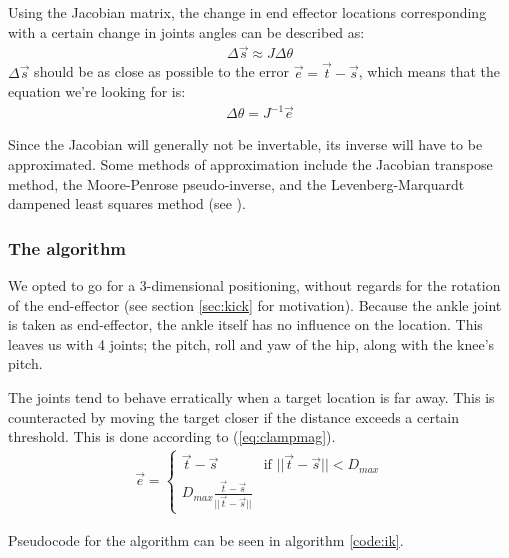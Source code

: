 \documentclass[a4paper]{article}
\begin{document}
Using the Jacobian matrix, the change in end effector locations
corresponding with a certain change in joints angles can be described
as:
\begin{align*}
  \Delta \vec{s} \approx J \Delta \theta
\end{align*}
$\Delta \vec{s}$ should be as close as possible to the error $\vec{e}
= \vec{t} - \vec{s}$, which means that the equation
we're looking for is:
\begin{align*}
  \Delta \theta = J^{-1} \vec{e}
\end{align*}

Since the Jacobian will generally not be invertable, its inverse will
have to be approximated. Some methods of approximation include the
Jacobian transpose method, the Moore-Penrose pseudo-inverse, and the
Levenberg-Marquardt dampened least squares method (see \cite{Buss2009}).

\subsubsection{The algorithm}
We opted to go for a 3-dimensional positioning, without regards for the rotation
of the end-effector (see section \ref{sec:kick} for motivation). Because the
ankle joint is taken as end-effector, the ankle itself has no influence on the
location. This leaves us with 4 joints; the pitch, roll and yaw of the hip,
along with the knee's pitch.

The joints tend to behave erratically when a target location is far away. This
is counteracted by moving the target closer if the distance exceeds a certain
threshold. This is done according to (\ref{eq:clampmag}).
\begin{align}
  \vec{e} = \begin{cases}
    \vec{t} - \vec{s} & \text{if } ||\vec{t} - \vec{s}|| < D_{max} \\
    D_{max} \frac{\vec{t} - \vec{s}}{||\vec{t} - \vec{s}||}
  \end{cases}      \label{eq:clampmag}
\end{align}

Pseudocode for the algorithm can be seen in algorithm \ref{code:ik}.
\end{document}
